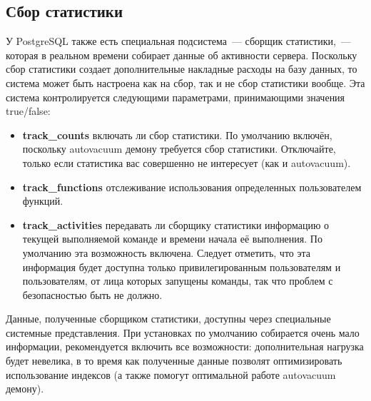 \subsection{Сбор статистики}
У PostgreSQL также есть специальная подсистема~--- сборщик статистики,~--- которая в реальном времени собирает данные об 
активности сервера. Поскольку сбор статистики создает дополнительные накладные расходы на базу данных, то система может быть настроена 
как на сбор, так и не сбор статистики вообще.
Эта система контролируется следующими параметрами, принимающими значения true/false:
\begin{itemize}
\item \textbf{track\_counts} включать ли сбор статистики. По умолчанию включён, поскольку autovacuum демону требуется сбор статистики. 
Отключайте, только если статистика вас совершенно не интересует (как и autovacuum).
\item \textbf{track\_functions} отслеживание использования определенных пользователем функций.
\item \textbf{track\_activities} передавать ли сборщику статистики информацию о текущей выполняемой команде и времени 
начала её выполнения. По умолчанию эта возможность включена. Следует отметить, что эта информация будет доступна только 
привилегированным пользователям и пользователям, от лица которых запущены команды, так что проблем с безопасностью быть не должно.
\end{itemize}

Данные, полученные сборщиком статистики, доступны через специальные системные представления. При установках по умолчанию собирается 
очень мало информации, рекомендуется включить все возможности: дополнительная нагрузка будет невелика, в то время как полученные 
данные позволят оптимизировать использование индексов (а также помогут оптимальной работе autovacuum демону).